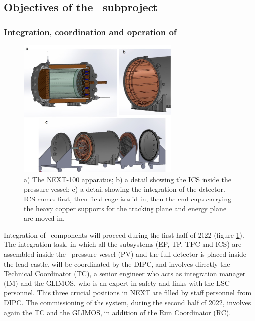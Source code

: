 \subsection{Objectives of the \sDIPC\ subproject}
\label{sec.obj.dipc}
\subsubsection*{Integration, coordination and operation of \Next}

\indent

\begin{figure}[!htb]
\centering
\includegraphics[width=0.7\textwidth]{img2/Next100Collage.jpg}
\caption{\small a) The NEXT-100 apparatus; b) a detail showing the ICS inside the pressure vessel; c) a detail showing the integration of the detector. ICS comes first, then field cage is slid in, then the end-caps carrying the heavy copper supports for the tracking plane and energy plane are moved in.} 
\label{fig.n100e}
\end{figure} 


Integration of \Next\ components will proceed during the first half of 2022 (figure \ref{fig.n100e}). The integration task, in which all the subsystems (EP, TP, TPC and ICS) are assembled inside the \Next\ pressure vessel (PV) and the full detector is placed inside the lead castle, will be coordinated by the DIPC, and involves directly the Technical Coordinator (TC), a senior engineer who acts as integration manager (IM) and the GLIMOS, who is an expert in safety and links with the LSC personnel. This three crucial positions in NEXT are filled by staff personnel from DIPC. The commissioning of the system, during the second half of 2022, involves again the TC and the GLIMOS, in addition of the Run Coordinator (RC).

